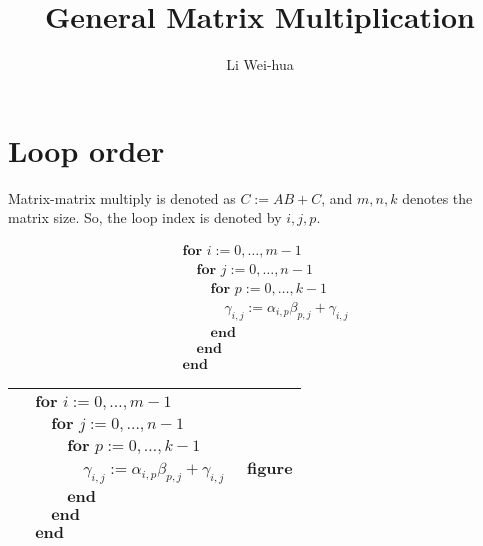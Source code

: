 \documentclass[a4paper,12pt]{article}
\title{General Matrix Multiplication}
\author{Li Wei-hua}
\date{}
\begin{document}
\maketitle

\section{Loop order}
Matrix-matrix multiply is denoted as $C := AB + C$, and $m, n, k$ denotes the matrix size.
So, the loop index is denoted by $i, j, p$.

\begin{align*}
&\textbf{for~} i := 0, \ldots , m-1 \\
&\hspace{1em} \textbf{for~} j := 0, \ldots , n-1 \\
&\hspace{2em} \textbf{for~} p := 0, \ldots , k-1 \\
&\hspace{3em} \gamma_{i,j} := \alpha_{i,p} \beta_{p,j} + \gamma_{i,j} \\
&\hspace{2em} \textbf{end} \\
&\hspace{1em} \textbf{end} \\
&\textbf{end}
\end{align*}


\begin{center}
\begin{tabular}{|l|c|}
\hline
{$\!\begin{aligned}
&\textbf{for~} i := 0, \ldots , m-1 \\
&\hspace{1em} \textbf{for~} j := 0, \ldots , n-1 \\
&\hspace{2em} \textbf{for~} p := 0, \ldots , k-1 \\
&\hspace{3em} \gamma_{i,j} := \alpha_{i,p} \beta_{p,j} + \gamma_{i,j} \\
&\hspace{2em} \textbf{end} \\
&\hspace{1em} \textbf{end} \\
&\textbf{end}
\end{aligned}$}
& figure \\
\hline
\end{tabular}
\end{center}
\end{document}
